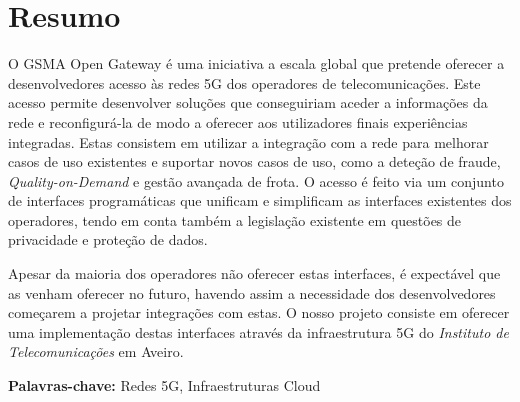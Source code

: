 \chapter*{\Large\centering Resumo}
\thispagestyle{empty}

O GSMA Open Gateway é uma iniciativa a escala global que pretende oferecer a
desenvolvedores acesso às redes 5G dos operadores de telecomunicações. Este
acesso permite desenvolver soluções que conseguiriam aceder a informações da
rede e reconfigurá-la de modo a oferecer aos utilizadores finais experiências
integradas. Estas consistem em utilizar a integração com a rede para melhorar
casos de uso existentes e suportar novos casos de uso, como a deteção de
fraude, \emph{Quality-on-Demand} e gestão avançada de frota. O acesso é feito
via um conjunto de interfaces programáticas que unificam e simplificam as
interfaces existentes dos operadores, tendo em conta também a legislação
existente em questões de privacidade e proteção de dados.

Apesar da maioria dos operadores não oferecer estas interfaces, é expectável
que as venham oferecer no futuro, havendo assim a necessidade dos
desenvolvedores começarem a projetar integrações com estas. O nosso projeto
consiste em oferecer uma implementação destas interfaces através da
infraestrutura 5G do \emph{Instituto de Telecomunicações} em Aveiro.

\vspace{1cm}

\noindent\textbf{Palavras-chave:} Redes 5G, Infraestruturas Cloud
